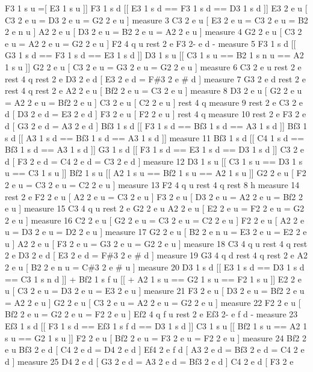 F3 1 s u =\mbox{[} E3 1 s u \mbox{]}\mbox{]} F3 1 s d \mbox{[}\mbox{[} E3 1 s d == F3 1 s d == D3 1 s d \mbox{]}\mbox{]} E3 2 e u \mbox{[} C3 2 e u = D3 2 e u = G2 2 e u \mbox{]} measure 3 C3 2 e u \mbox{[} E3 2 e u = C3 2 e u = B2 2 e n u \mbox{]} A2 2 e u \mbox{[} D3 2 e u = B2 2 e u = A2 2 e u \mbox{]} measure 4 G2 2 e u \mbox{[} C3 2 e u = A2 2 e u = G2 2 e u \mbox{]} F2 4 q u rest 2 e F3 2-\/ e d -\/ measure 5 F3 1 s d \mbox{[}\mbox{[} G3 1 s d == F3 1 s d == E3 1 s d \mbox{]}\mbox{]} D3 1 s u \mbox{[}\mbox{[} C3 1 s u == B2 1 s n u == A2 1 s u \mbox{]}\mbox{]} G2 2 e u \mbox{[} C3 2 e u = G3 2 e u = G2 2 e u \mbox{]} measure 6 C3 2 e u rest 2 e rest 4 q rest 2 e D3 2 e d \mbox{[} E3 2 e d = F\#3 2 e \# d \mbox{]} measure 7 G3 2 e d rest 2 e rest 4 q rest 2 e A2 2 e u \mbox{[} Bf2 2 e u = C3 2 e u \mbox{]} measure 8 D3 2 e u \mbox{[} G2 2 e u = A2 2 e u = Bf2 2 e u \mbox{]} C3 2 e u \mbox{[} C2 2 e u \mbox{]} rest 4 q measure 9 rest 2 e C3 2 e d \mbox{[} D3 2 e d = E3 2 e d \mbox{]} F3 2 e u \mbox{[} F2 2 e u \mbox{]} rest 4 q measure 10 rest 2 e F3 2 e d \mbox{[} G3 2 e d = A3 2 e d \mbox{]} Bf3 1 s d \mbox{[}\mbox{[} F3 1 s d == Bf3 1 s d == A3 1 s d \mbox{]}\mbox{]} Bf3 1 s d \mbox{[}\mbox{[} A3 1 s d == Bf3 1 s d == A3 1 s d \mbox{]}\mbox{]} measure 11 Bf3 1 s d \mbox{[}\mbox{[} C4 1 s d == Bf3 1 s d == A3 1 s d \mbox{]}\mbox{]} G3 1 s d \mbox{[}\mbox{[} F3 1 s d == E3 1 s d == D3 1 s d \mbox{]}\mbox{]} C3 2 e d \mbox{[} F3 2 e d = C4 2 e d = C3 2 e d \mbox{]} measure 12 D3 1 s u \mbox{[}\mbox{[} C3 1 s u == D3 1 s u == C3 1 s u \mbox{]}\mbox{]} Bf2 1 s u \mbox{[}\mbox{[} A2 1 s u == Bf2 1 s u == A2 1 s u \mbox{]}\mbox{]} G2 2 e u \mbox{[} F2 2 e u = C3 2 e u = C2 2 e u \mbox{]} measure 13 F2 4 q u rest 4 q rest 8 h measure 14 rest 2 e F2 2 e u \mbox{[} A2 2 e u = C3 2 e u \mbox{]} F3 2 e u \mbox{[} D3 2 e u = A2 2 e u = Bf2 2 e u \mbox{]} measure 15 C3 4 q u rest 2 e G2 2 e u A2 2 e u \mbox{[} E2 2 e u = F2 2 e u = G2 2 e u \mbox{]} measure 16 C2 2 e u \mbox{[} G2 2 e u = C3 2 e u = C2 2 e u \mbox{]} F2 2 e u \mbox{[} A2 2 e u = D3 2 e u = D2 2 e u \mbox{]} measure 17 G2 2 e u \mbox{[} B2 2 e n u = E3 2 e u = E2 2 e u \mbox{]} A2 2 e u \mbox{[} F3 2 e u = G3 2 e u = G2 2 e u \mbox{]} measure 18 C3 4 q u rest 4 q rest 2 e D3 2 e d \mbox{[} E3 2 e d = F\#3 2 e \# d \mbox{]} measure 19 G3 4 q d rest 4 q rest 2 e A2 2 e u \mbox{[} B2 2 e n u = C\#3 2 e \# u \mbox{]} measure 20 D3 1 s d \mbox{[}\mbox{[} E3 1 s d == D3 1 s d == C3 1 s n d \mbox{]}\mbox{]} + Bf2 1 s f u \mbox{[}\mbox{[} + A2 1 s u == G2 1 s u == F2 1 s u \mbox{]}\mbox{]} E2 2 e u \mbox{[} C3 2 e u = D3 2 e u = E3 2 e u \mbox{]} measure 21 F3 2 e u \mbox{[} D3 2 e u = Bf2 2 e u = A2 2 e u \mbox{]} G2 2 e u \mbox{[} C3 2 e u = A2 2 e u = G2 2 e u \mbox{]} measure 22 F2 2 e u \mbox{[} Bf2 2 e u = G2 2 e u = F2 2 e u \mbox{]} Ef2 4 q f u rest 2 e Ef3 2-\/ e f d -\/ measure 23 Ef3 1 s d \mbox{[}\mbox{[} F3 1 s d == Ef3 1 s f d == D3 1 s d \mbox{]}\mbox{]} C3 1 s u \mbox{[}\mbox{[} Bf2 1 s u == A2 1 s u == G2 1 s u \mbox{]}\mbox{]} F2 2 e u \mbox{[} Bf2 2 e u = F3 2 e u = F2 2 e u \mbox{]} measure 24 Bf2 2 e u Bf3 2 e d \mbox{[} C4 2 e d = D4 2 e d \mbox{]} Ef4 2 e f d \mbox{[} A3 2 e d = Bf3 2 e d = C4 2 e d \mbox{]} measure 25 D4 2 e d \mbox{[} G3 2 e d = A3 2 e d = Bf3 2 e d \mbox{]} C4 2 e d \mbox{[} F3 2 e 